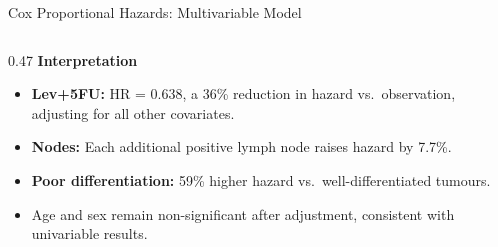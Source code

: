 \documentclass[aspectratio=169, 10pt]{beamer}
\begin{document}
\begin{frame}{Cox Proportional Hazards: Multivariable Model}
\begin{columns}[T]
  \begin{column}{0.47\textwidth}
    \textbf{Interpretation}
    \medskip
    \begin{itemize}
      \item [$\blacksquare$] \textbf{Lev+5FU:} HR = 0.638, a
            \alert{36\% reduction in hazard}
            vs.\ observation, adjusting for all other
            covariates.
      \item [$\blacksquare$] \textbf{Nodes:} Each additional positive
            lymph node raises hazard by 7.7\%.
      \item [$\blacksquare$] \textbf{Poor differentiation:} 59\% higher
            hazard vs.\ well-differentiated tumours.
      \item [$\blacksquare$] Age and sex remain non-significant after
            adjustment, consistent with univariable
            results.
    \end{itemize}
  \end{column}
\end{columns}

\end{frame}

\end{document}
